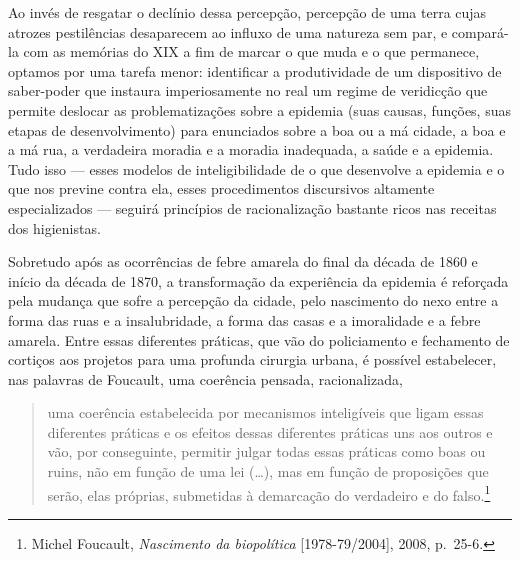 Ao invés de resgatar o declínio dessa percepção, percepção de uma terra
cujas atrozes pestilências desaparecem ao influxo de uma natureza sem
par, e compará-la com as memórias do XIX a fim de marcar o que muda e o
que permanece, optamos por uma tarefa menor: identificar a produtividade
de um dispositivo de saber-poder que instaura imperiosamente no real um
regime de veridicção que permite deslocar as problematizações sobre a
epidemia (suas causas, funções, suas etapas de desenvolvimento) para
enunciados sobre a boa ou a má cidade, a boa e a má rua, a verdadeira
moradia e a moradia inadequada, a saúde e a epidemia. Tudo isso --- esses
modelos de inteligibilidade de o que desenvolve a epidemia e o que nos
previne contra ela, esses procedimentos discursivos altamente
especializados --- seguirá princípios de racionalização bastante ricos
nas receitas dos higienistas.

Sobretudo após as ocorrências de febre amarela do final da década de
1860 e início da década de 1870, a transformação da experiência da
epidemia é reforçada pela mudança que sofre a percepção da cidade, pelo
nascimento do nexo entre a forma das ruas e a insalubridade, a forma das
casas e a imoralidade e a febre amarela. Entre essas diferentes
práticas, que vão do policiamento e fechamento de cortiços aos projetos
para uma profunda cirurgia urbana, é possível estabelecer, nas palavras
de Foucault, uma coerência pensada, racionalizada,

\begin{quote}
uma coerência estabelecida por mecanismos inteligíveis que ligam essas
diferentes práticas e os efeitos dessas diferentes práticas uns aos
outros e vão, por conseguinte, permitir julgar todas essas práticas como
boas ou ruins, não em função de uma lei (\dots{}), mas em função de
proposições que serão, elas próprias, submetidas à demarcação do
verdadeiro e do falso.\footnote{Michel Foucault, \textit{Nascimento da
  biopolítica} {[}1978-79/2004{]}, 2008, p.~25-6.}
\end{quote}

